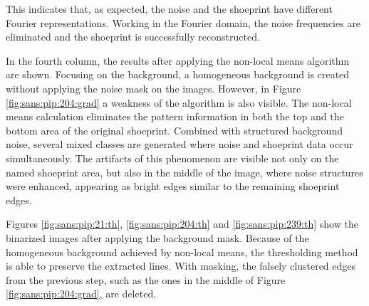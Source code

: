 \documentclass[draft,final]{vutinfth} %
\begin{document}
This indicates that, as expected, the noise and the shoeprint have different Fourier representations.
Working in the Fourier domain, the noise frequencies are eliminated and the shoeprint is successfully reconstructed.
\par
In the fourth column, the results after applying the non-local means algorithm are shown.
Focusing on the background, a homogeneous background is created without applying the noise mask on the images.
However, in Figure \ref{fig:sans:pip:204:grad} a weakness of the algorithm is also visible.
The non-local means calculation eliminates the pattern information in both the top and the bottom area of the original shoeprint.
Combined with structured background noise, several mixed classes are generated where noise and shoeprint data occur simultaneously.
The artifacts of this phenomenon are visible not only on the named shoeprint area, but also in the middle of the image, where noise structures were enhanced, appearing as bright edges similar to the remaining shoeprint edges.
\par
Figures \ref{fig:sans:pip:21:th}, \ref{fig:sans:pip:204:th} and \ref{fig:sans:pip:239:th} show the binarized images after applying the background mask.
Because of the homogeneous background achieved by non-local means, the thresholding method is able to preserve the extracted lines.
With masking, the falsely clustered edges from the previous step, such as the ones in the middle of Figure \ref{fig:sans:pip:204:grad}, are deleted.
\end{document}
